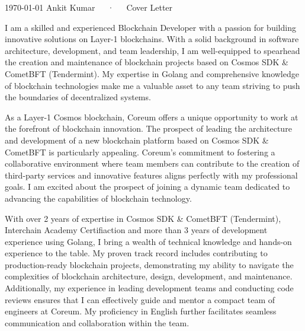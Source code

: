 \documentclass[11pt, a4paper]{awesome-cv}
\begin{document}
\makecvheader[R]

\makecvfooter
  {\today}
  {Ankit Kumar~~~·~~~Cover Letter}
  {}

\makelettertitle

\begin{cvletter}

I am a skilled and experienced Blockchain Developer with a passion for building innovative solutions on Layer-1 blockchains. With a solid background in software architecture, development, and team leadership, I am well-equipped to spearhead the creation and maintenance of blockchain projects based on Cosmos SDK \& CometBFT (Tendermint). My expertise in Golang and comprehensive knowledge of blockchain technologies make me a valuable asset to any team striving to push the boundaries of decentralized systems.


As a Layer-1 Cosmos blockchain, Coreum offers a unique opportunity to work at the forefront of blockchain innovation. The prospect of leading the architecture and development of a new blockchain platform based on Cosmos SDK \& CometBFT is particularly appealing. Coreum's commitment to fostering a collaborative environment where team members can contribute to the creation of third-party services and innovative features aligns perfectly with my professional goals. I am excited about the prospect of joining a dynamic team dedicated to advancing the capabilities of blockchain technology.

With over 2 years of expertise in Cosmos SDK \& CometBFT (Tendermint), Interchain Academy Certifiaction and more than 3 years of development experience using Golang, I bring a wealth of technical knowledge and hands-on experience to the table. My proven track record includes contributing to production-ready blockchain projects, demonstrating my ability to navigate the complexities of blockchain architecture, design, development, and maintenance. Additionally, my experience in leading development teams and conducting code reviews ensures that I can effectively guide and mentor a compact team of engineers at Coreum. My proficiency in English further facilitates seamless communication and collaboration within the team.
\end{cvletter}


\makeletterclosing
\end{document}
